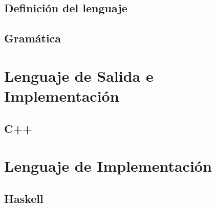 	\subsection{Definición del lenguaje}
	
	\subsection{Gramática}

\section{Lenguaje de Salida e Implementación}
	\subsection{C++}

\section{Lenguaje de Implementación}
	\subsection{Haskell}



